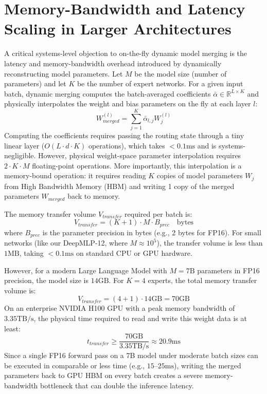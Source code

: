 \section{Memory-Bandwidth and Latency Scaling in Larger Architectures}
\label{app:systems_scaling}

A critical systems-level objection to on-the-fly dynamic model merging is the latency and memory-bandwidth overhead introduced by dynamically reconstructing model parameters. Let $M$ be the model size (number of parameters) and let $K$ be the number of expert networks. For a given input batch, dynamic merging computes the batch-averaged coefficients $\bar{\alpha} \in \mathbb{R}^{L \times K}$ and physically interpolates the weight and bias parameters on the fly at each layer $l$:
\begin{equation}
W_{merged}^{(l)} = \sum_{j=1}^K \bar{\alpha}_{l, j} W_j^{(l)}
\end{equation}
Computing the coefficients requires passing the routing state through a tiny linear layer ($O(L \cdot d \cdot K)$ operations), which takes $<0.1\text{ms}$ and is systems-negligible. However, physical weight-space parameter interpolation requires $2 \cdot K \cdot M$ floating-point operations. More importantly, this interpolation is a memory-bound operation: it requires reading $K$ copies of model parameters $W_j$ from High Bandwidth Memory (HBM) and writing 1 copy of the merged parameters $W_{merged}$ back to memory. 

The memory transfer volume $V_{transfer}$ required per batch is:
\begin{equation}
V_{transfer} = (K + 1) \cdot M \cdot B_{prec} \quad \text{bytes}
\end{equation}
where $B_{prec}$ is the parameter precision in bytes (e.g., 2 bytes for FP16). For small networks (like our DeepMLP-12, where $M \approx 10^5$), the transfer volume is less than $1\text{MB}$, taking $<0.1\text{ms}$ on standard CPU or GPU hardware.

However, for a modern Large Language Model with $M = 7\text{B}$ parameters in FP16 precision, the model size is $14\text{GB}$. For $K=4$ experts, the total memory transfer volume is:
\begin{equation}
V_{transfer} = (4 + 1) \cdot 14\text{GB} = 70\text{GB}
\end{equation}
On an enterprise NVIDIA H100 GPU with a peak memory bandwidth of $3.35\text{TB/s}$, the physical time required to read and write this weight data is at least:
\begin{equation}
t_{transfer} \ge \frac{70\text{GB}}{3.35\text{TB/s}} \approx 20.9\text{ms}
\end{equation}
Since a single FP16 forward pass on a 7B model under moderate batch sizes can be executed in comparable or less time (e.g., $15$--$25\text{ms}$), writing the merged parameters back to GPU HBM on every batch creates a severe memory-bandwidth bottleneck that can double the inference latency.


